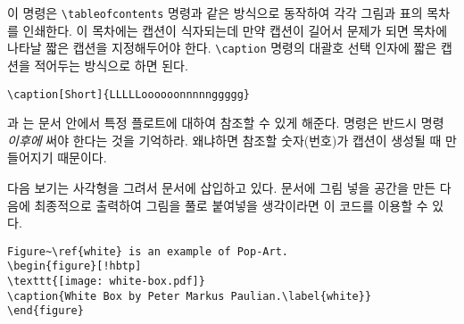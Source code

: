 \noindent 이 명령은 \verb|\tableofcontents| 명령과 같은 방식으로 동작하여
각각 그림과 표의 목차를 인쇄한다.
이 목차에는 캡션이 식자되는데 만약 캡션이 길어서 문제가 되면 목차에 나타날 
짧은 캡션을 지정해두어야 한다.
\verb|\caption| 명령의 대괄호 선택 인자에 짧은 캡션을 적어두는 방식으로 하면 된다.
\begin{code}
\verb|\caption[Short]{LLLLLoooooonnnnnggggg}|
\end{code}

과 는 문서 안에서 특정 플로트에 대하여 참조할 수 있게 해준다.
 명령은 반드시  명령 \emph{이후에} 써야 한다는 것을 기억하라.
왜냐하면 참조할 숫자(번호)가 캡션이 생성될 때 만들어지기 때문이다.

다음 보기는 사각형을 그려서 문서에 삽입하고 있다.
문서에 그림 넣을 공간을 만든 다음에 최종적으로 출력하여 그림을 풀로 붙여넣을 
생각이라면 이 코드를 이용할 수 있다.

\begin{code}
\begin{verbatim}
Figure~\ref{white} is an example of Pop-Art.
\begin{figure}[!hbtp]
\texttt{[image: white-box.pdf]}
\caption{White Box by Peter Markus Paulian.\label{white}}
\end{figure}
\end{verbatim}
\end{code}

